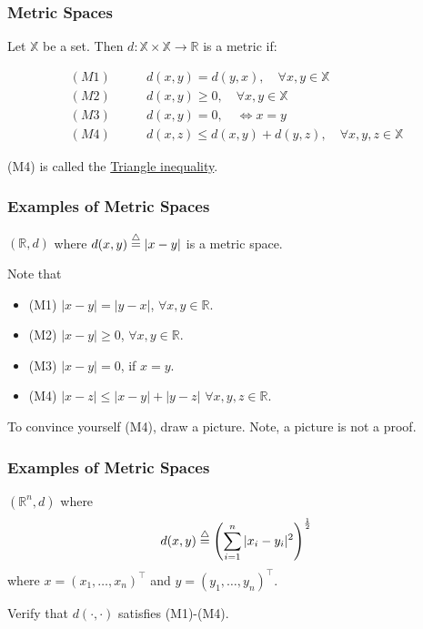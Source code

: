 \documentclass{beamer}
\begin{document}
\begin{frame}\frametitle{Metric Spaces}
\begin{definition}[Metric]
Let $\mathbb{X}$ be a set.  Then 
$d:\mathbb{X} \times \mathbb{X} \to \mathbb{R}$ is a metric if:

\begin{align*} 
(M1) \qquad & d(x,y) = d(y,x), \quad \forall x,y \in \mathbb{X} \\
(M2) \qquad & d(x,y) \geq 0, \quad \forall x,y \in \mathbb{X} \\
(M3) \qquad & d(x,y) = 0, \quad \iff x = y\\
(M4) \qquad &d(x,z) \leq d(x,y) + d(y,z), \quad \forall x,y,z \in \mathbb{X}
\end{align*}
\end{definition}

(M4) is called the \underline{Triangle inequality}.
\end{frame}

\begin{frame}\frametitle{Examples of Metric Spaces}

\begin{example}[E1]

$(\mathbb{R}, d)$ where $d(x,y) \stackrel{\triangle}{=} |x-y|$ is a metric space.

Note that 
\begin{itemize}
	\item (M1) $|x-y| = |y-x|$, $\forall x,y \in \mathbb{R}$.
	\item (M2) $|x-y|\geq 0$, $\forall x,y \in \mathbb{R}$.	
	\item (M3) $|x-y| = 0$, if $x=y$.	
	\item (M4) $|x-z|\leq |x-y| + |y-z|$ $\forall x,y,z \in \mathbb{R}$. 
\end{itemize}
\end{example}

To convince yourself (M4), draw a picture.  Note, a picture is not a proof.

\end{frame}

\begin{frame}\frametitle{Examples of Metric Spaces}

\begin{example}[E2]

$(\mathbb{R}^n, d)$ where 
\[
d(x,y) \stackrel{\triangle}{=} \left( \sum_{i=1}^{n} |x_i - y_i|^2 \right)^{\frac{1}{2}}
\]
where $x=(x_1, \dots, x_n)^\top$ and $y=(y_1, \dots, y_n)^\top$.

Verify that $d(\cdot, \cdot)$ satisfies (M1)-(M4).
\end{example}
\end{frame}
\end{document}
